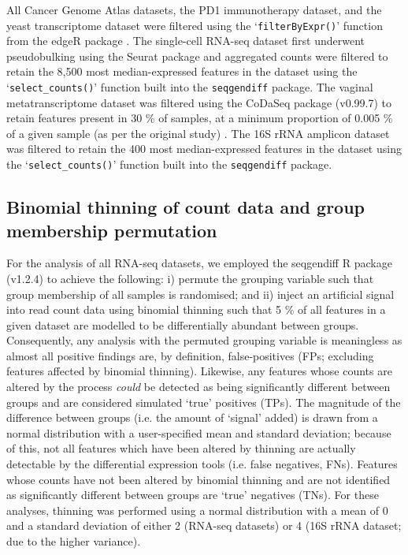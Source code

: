 \documentclass[10pt,letterpaper]{article}
\begin{document}
All Cancer Genome Atlas datasets, the PD1 immunotherapy dataset, and the yeast transcriptome dataset were filtered using the `\texttt{filterByExpr()}' function from the edgeR package \cite{robinson_edger_2010}. The single-cell RNA-seq dataset first underwent pseudobulking using the Seurat package \cite{stuart_comprehensive_2019} and aggregated counts were filtered to retain the 8,500 most median-expressed features in the dataset using the `\texttt{select\_counts()}' function built into the \texttt{seqgendiff} package. The vaginal metatranscriptome dataset was filtered using the CoDaSeq package (v0.99.7) \cite{gloor_codaseq} to retain features present in 30 \% of samples, at a minimum proportion of 0.005 \% of a given sample (as per the original study) \cite{dos_santos_vaginal_2024}. The 16S rRNA amplicon dataset was filtered to retain the 400 most median-expressed features in the dataset using the `\texttt{select\_counts()}' function built into the \texttt{seqgendiff} package.

\subsection*{Binomial thinning of count data and group membership permutation}
For the analysis of all RNA-seq datasets, we employed the seqgendiff R package (v1.2.4) \cite{gerard_data-based_2020} to achieve the following: i) permute the grouping variable such that group membership of all samples is randomised; and ii) inject an artificial signal into read count data using binomial thinning such that 5 \% of all features in a given dataset are modelled to be differentially abundant between groups. Consequently, any analysis with the permuted grouping variable is meaningless as almost all positive findings are, by definition, false-positives (FPs; excluding features affected by binomial thinning). Likewise, any features whose counts are altered by the process \emph{could} be detected as being significantly different between groups and are considered simulated `true' positives (TPs). The magnitude of the difference between groups (i.e. the amount of `signal' added) is drawn from a normal distribution with a user-specified mean and standard deviation; because of this, not all features which have been altered by thinning are actually detectable by the differential expression tools (i.e. false negatives, FNs). Features whose counts have not been altered by binomial thinning and are not identified as significantly different between groups are `true' negatives (TNs). For these analyses, thinning was performed using a normal distribution with a mean of 0 and a standard deviation of either 2 (RNA-seq datasets) or 4 (16S rRNA dataset; due to the higher variance).
\end{document}
